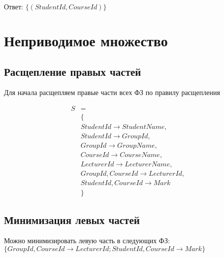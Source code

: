 \documentclass{article}
\begin{document}
	Ответ: $\{(StudentId, CourseId)\}$
	
	\section{Неприводимое множество}
	
	\subsection{Расщепление правых частей}
	
	Для начала расщепляем правые части всех ФЗ по правилу расщепления
	
	\begin{align*}
	S &=\\ 
	&\{ \\
	&StudentId \rightarrow StudentName,\\
	&StudentId \rightarrow GroupId,\\
	& GroupId \rightarrow GroupName,\\
	&CourseId \rightarrow CourseName,\\
	&LecturerId \rightarrow LecturerName,\\
	&GroupId, CourseId \rightarrow LecturerId,\\ 
	&StudentId, CourseId \rightarrow Mark\\
	&\}
	\end{align*}
	
	\subsection{Минимизация левых частей}
	
	Можно минимизировать левую часть в следующих ФЗ: $\{GroupId, CourseId \rightarrow LecturerId; StudentId, CourseId \rightarrow Mark\}$
	
\end{document}
